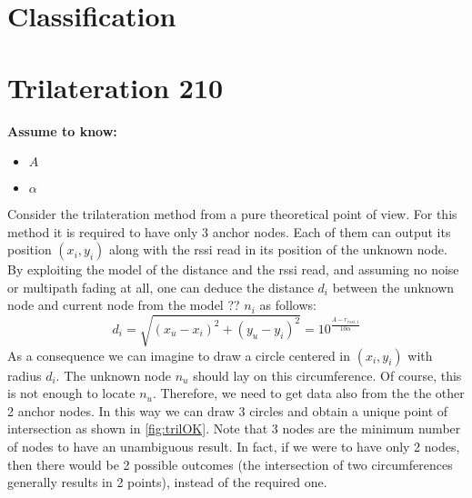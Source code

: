 \documentclass[12pt,twoside]{report}
\begin{document}
\section{Classification}

\clearpage
\section{Trilateration 210}

  \begin{center}
  \textbf{Assume to know:}
  \begin{itemize}
    \centering
    \item $A$
    \item $\alpha$
  \end{itemize}
  \end{center}
Consider the trilateration method from a pure theoretical point of view. For this method it is required to have only 3 anchor nodes. Each of them can output its position $(x_i,y_i)$ along with the rssi read in its position of the unknown node. By exploiting the model of the distance and the rssi read, and assuming no noise or multipath fading at all, one can deduce the distance $d_i$ between the unknown node and current node from the model ?? $n_i$ as follows:  
\begin{equation}
    d_i=\sqrt{(x_u-x_i)^2+(y_u-y_i)^2}=10^{\frac{A-r_{rssi,i}}{10\alpha}}    
\end{equation}
As a consequence we can imagine to draw a circle centered in $(x_i,y_i)$ with radius $d_i$. The unknown node $n_u$ should lay on this circumference. Of course, this is not enough to locate $n_u$. Therefore, we need to get data also from the the other 2 anchor nodes. In this way we can draw 3 circles and obtain a unique point of intersection as shown in \ref{fig:trilOK}. Note that 3 nodes are the minimum number of nodes to have an unambiguous result. In fact, if we were to have only 2 nodes, then there would be 2 possible outcomes (the intersection of two circumferences generally results in 2 points), instead of the required one.
\end{document}
